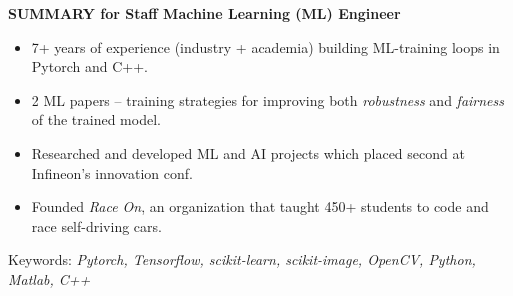 \documentclass[11pt]{article}
\begin{document}
\begin{tcolorbox}[enhanced, boxrule=0.5pt, colback=white, top=6mm, bottom=4mm, right=5mm, left=5mm, arc=0mm, leftrule=0mm, rightrule=0mm]
    {\large 
    \textbf{\Large SUMMARY for Staff Machine Learning (ML) Engineer }
    \begin{itemize}[left=0pt]
    \item 7+ years of experience (industry + academia) building ML-training loops in Pytorch and C++.
    \item 2 ML papers -- training strategies for improving both \textit{robustness} and \textit{fairness} of the trained model.
    \item Researched and developed ML and AI projects which placed second at Infineon's innovation conf.
    \item Founded \textit{Race On}, an organization that taught 450+ students to code and race self-driving cars.
    \end{itemize}

    {\normalsize Keywords: \textit{Pytorch, Tensorflow, scikit-learn, scikit-image, OpenCV, Python, Matlab, C++}}
    
       
    }

\end{tcolorbox}
\end{document}

